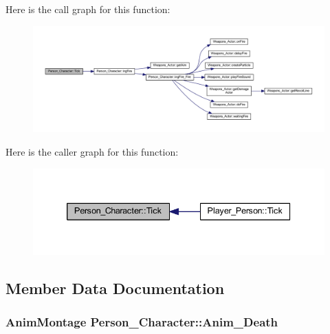 Here is the call graph for this function\+:\nopagebreak
\begin{figure}[H]
\begin{center}
\leavevmode
\includegraphics[width=350pt]{class_person___character_a49833f356173ccfe8857fcbc8e7cf2ad_cgraph}
\end{center}
\end{figure}




Here is the caller graph for this function\+:\nopagebreak
\begin{figure}[H]
\begin{center}
\leavevmode
\includegraphics[width=339pt]{class_person___character_a49833f356173ccfe8857fcbc8e7cf2ad_icgraph}
\end{center}
\end{figure}




\subsection{Member Data Documentation}
\subsubsection[{\texorpdfstring{Anim\+\_\+\+Death}{Anim_Death}}]{\setlength{\rightskip}{0pt plus 5cm}Anim\+Montage Person\+\_\+\+Character\+::\+Anim\+\_\+\+Death}\hypertarget{class_person___character_a9e4810e11470421fc099e96537fa1de7}{}\label{class_person___character_a9e4810e11470421fc099e96537fa1de7}
